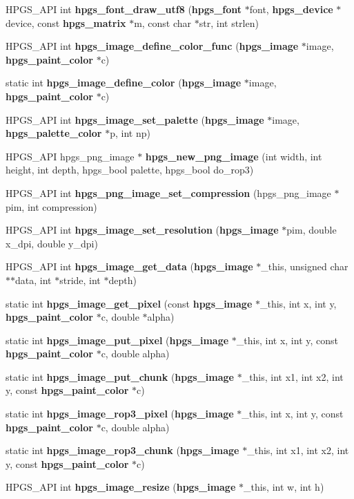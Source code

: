 \begin{CompactItemize}
HPGS\_\-API int {\bf hpgs\_\-font\_\-draw\_\-utf8} ({\bf hpgs\_\-font} $\ast$font, {\bf hpgs\_\-device} $\ast$device, const {\bf hpgs\_\-matrix} $\ast$m, const char $\ast$str, int strlen)
\item 
HPGS\_\-API int {\bf hpgs\_\-image\_\-define\_\-color\_\-func} ({\bf hpgs\_\-image} $\ast$image, {\bf hpgs\_\-paint\_\-color} $\ast$c)
\item 
static int {\bf hpgs\_\-image\_\-define\_\-color} ({\bf hpgs\_\-image} $\ast$image, {\bf hpgs\_\-paint\_\-color} $\ast$c)
\item 
HPGS\_\-API int {\bf hpgs\_\-image\_\-set\_\-palette} ({\bf hpgs\_\-image} $\ast$image, {\bf hpgs\_\-palette\_\-color} $\ast$p, int np)
\item 
HPGS\_\-API hpgs\_\-png\_\-image $\ast$ {\bf hpgs\_\-new\_\-png\_\-image} (int width, int height, int depth, hpgs\_\-bool palette, hpgs\_\-bool do\_\-rop3)
\item 
HPGS\_\-API int {\bf hpgs\_\-png\_\-image\_\-set\_\-compression} (hpgs\_\-png\_\-image $\ast$pim, int compression)
\item 
HPGS\_\-API int {\bf hpgs\_\-image\_\-set\_\-resolution} ({\bf hpgs\_\-image} $\ast$pim, double x\_\-dpi, double y\_\-dpi)
\item 
HPGS\_\-API int {\bf hpgs\_\-image\_\-get\_\-data} ({\bf hpgs\_\-image} $\ast$\_\-this, unsigned char $\ast$$\ast$data, int $\ast$stride, int $\ast$depth)
\item 
static int {\bf hpgs\_\-image\_\-get\_\-pixel} (const {\bf hpgs\_\-image} $\ast$\_\-this, int x, int y, {\bf hpgs\_\-paint\_\-color} $\ast$c, double $\ast$alpha)
\item 
static int {\bf hpgs\_\-image\_\-put\_\-pixel} ({\bf hpgs\_\-image} $\ast$\_\-this, int x, int y, const {\bf hpgs\_\-paint\_\-color} $\ast$c, double alpha)
\item 
static int {\bf hpgs\_\-image\_\-put\_\-chunk} ({\bf hpgs\_\-image} $\ast$\_\-this, int x1, int x2, int y, const {\bf hpgs\_\-paint\_\-color} $\ast$c)
\item 
static int {\bf hpgs\_\-image\_\-rop3\_\-pixel} ({\bf hpgs\_\-image} $\ast$\_\-this, int x, int y, const {\bf hpgs\_\-paint\_\-color} $\ast$c, double alpha)
\item 
static int {\bf hpgs\_\-image\_\-rop3\_\-chunk} ({\bf hpgs\_\-image} $\ast$\_\-this, int x1, int x2, int y, const {\bf hpgs\_\-paint\_\-color} $\ast$c)
\item 
HPGS\_\-API int {\bf hpgs\_\-image\_\-resize} ({\bf hpgs\_\-image} $\ast$\_\-this, int w, int h)
$$
\end{CompactItemize}
